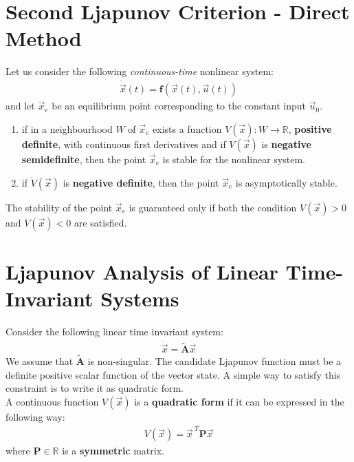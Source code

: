 \documentclass[12pt,a4paper,oneside]{book}
\begin{document}
\begin{onehalfspace}
\section{Second Ljapunov Criterion - Direct Method}
Let us consider the following \textit{continuous-time} nonlinear system:
\begin{equation}\label{eqlyap9}
	\begin{aligned}
		\dot{\vec{x}}(t)=\mathbf{f}\left(\vec{x}(t),\vec{u}(t)\right) 
	\end{aligned}
\end{equation}
and let $\vec{x}_e$ be an equilibrium point corresponding to the constant input 
$\vec{u}_0$. 
\begin{enumerate}
	\item if in a neighbourhood $W$ of $\vec{x}_e$ exists a function 
	$V(\vec{x}) : W \rightarrow\mathbb{R}$, \textbf{positive definite}, with 
	continuous first derivatives and if $\dot{V}(\vec{x})$ is \textbf{negative 
	semidefinite}, then the point $\vec{x}_e$ is stable for the nonlinear 
	system.
	\item if $\dot{V}(\vec{x})$ is \textbf{negative definite}, then the point 
	$\vec{x}_e$ is asymptotically stable.
\end{enumerate}
The stability of the point $\vec{x}_e$ is guaranteed only if both the condition 
${V}(\vec{x}) > 0$ and $\dot{V}(\vec{x}) < 0$ are satisfied.

\section{Ljapunov Analysis of Linear Time-Invariant Systems}
Consider the following linear time invariant system:
\begin{equation}\label{eqlyap_direct_1}
	\begin{aligned}
		\dot{\vec{x}}=\tilde{\mathbf{A}}\vec{x}
	\end{aligned}
\end{equation}
We assume that $\tilde{\mathbf{A}}$ is non-singular. 
The candidate Ljapunov function must be a definite positive scalar function of 
the vector state. A simple way to satisfy this constraint is to write it as 
quadratic form.\\
A continuous function $V(\vec{x})$ is a \textbf{quadratic form } if it can be 
expressed in the following way:
\begin{equation}\label{eqlyap10}
	\begin{aligned}
		V(\vec{x})=\vec{x}^{\ T}\mathbf{P}\vec{x}
	\end{aligned}
\end{equation}
where $\mathbf{P} \in \mathbb{R}$ is a \textbf{symmetric} matrix.


\end{onehalfspace}
\end{document}
